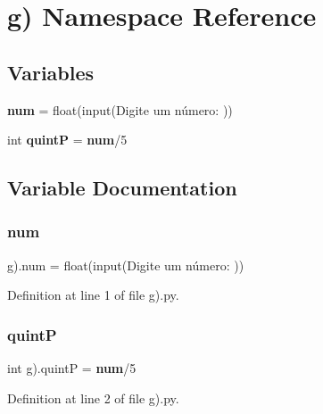 \section{g) Namespace Reference}
\label{namespaceg_08}
\subsection*{Variables}
\begin{DoxyCompactItemize}
\item 
\textbf{ num} = float(input(\textquotesingle{}Digite um número\+: \textquotesingle{}))
\item 
int \textbf{ quintP} = \textbf{ num}/5
\end{DoxyCompactItemize}


\subsection{Variable Documentation}
\mbox{\label{namespaceg_08_a06dd659743516d91d9829d4b7b7c9e47}} 
\subsubsection{num}
{\footnotesize\ttfamily g).num = float(input(\textquotesingle{}Digite um número\+: \textquotesingle{}))}



Definition at line 1 of file g).\+py.

\mbox{\label{namespaceg_08_a5f91ea4d03babdad02919dc0ab2a976a}} 
\subsubsection{quintP}
{\footnotesize\ttfamily int g).quintP = \textbf{ num}/5}



Definition at line 2 of file g).\+py.

